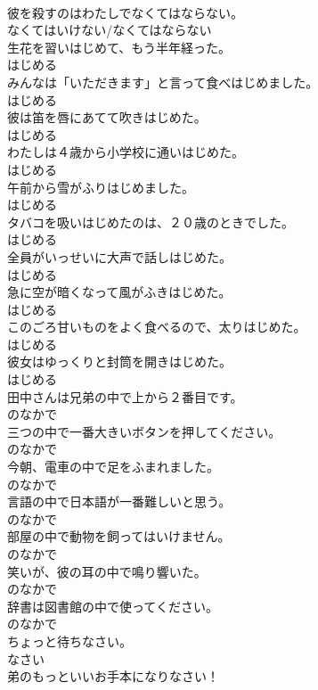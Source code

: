 \documentclass[8pt]{extreport}
\begin{document}
\begin{CJK}{UTF8}{min}
\\	彼を殺すのはわたしでなくてはならない。	
\\	なくてはいけない/なくてはならない
\\	生花を習いはじめて、もう半年経った。	
\\	はじめる
\\	みんなは「いただきます」と言って食べはじめました。	
\\	はじめる
\\	彼は笛を唇にあてて吹きはじめた。	
\\	はじめる
\\	わたしは４歳から小学校に通いはじめた。	
\\	はじめる
\\	午前から雪がふりはじめました。	
\\	はじめる
\\	タバコを吸いはじめたのは、２０歳のときでした。	
\\	はじめる
\\	全員がいっせいに大声で話しはじめた。	
\\	はじめる
\\	急に空が暗くなって風がふきはじめた。	
\\	はじめる
\\	このごろ甘いものをよく食べるので、太りはじめた。	
\\	はじめる
\\	彼女はゆっくりと封筒を開きはじめた。	
\\	はじめる
\\	田中さんは兄弟の中で上から２番目です。	
\\	のなかで
\\	三つの中で一番大きいボタンを押してください。	
\\	のなかで
\\	今朝、電車の中で足をふまれました。	
\\	のなかで
\\	言語の中で日本語が一番難しいと思う。	
\\	のなかで
\\	部屋の中で動物を飼ってはいけません。	
\\	のなかで
\\	笑いが、彼の耳の中で鳴り響いた。	
\\	のなかで
\\	辞書は図書館の中で使ってください。	
\\	のなかで
\\	ちょっと待ちなさい。	
\\	なさい
\\	弟のもっといいお手本になりなさい！	

\end{CJK}
\end{document}
